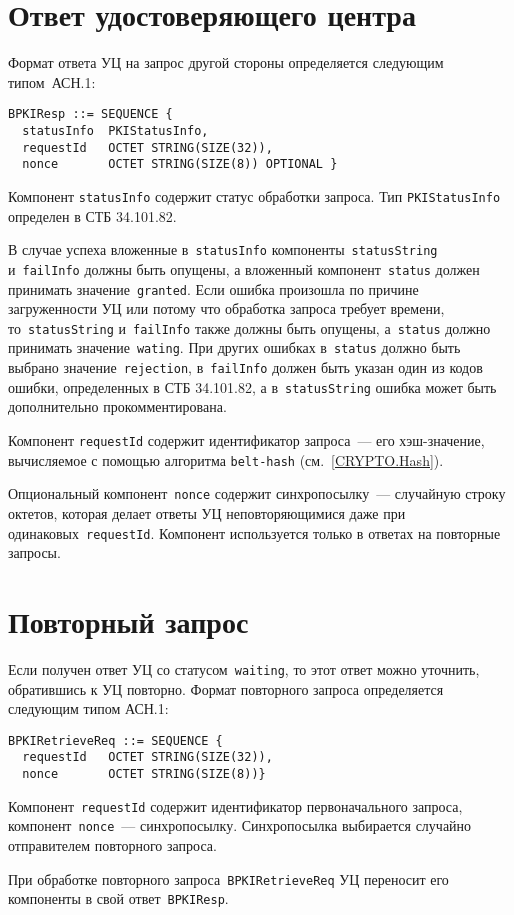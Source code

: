 \section{Ответ удостоверяющего центра}\label{FMT.BPKIResp}

Формат ответа УЦ на запрос другой стороны определяется следующим типом~АСН.1:
\begin{verbatim}
BPKIResp ::= SEQUENCE { 
  statusInfo  PKIStatusInfo,
  requestId   OCTET STRING(SIZE(32)),
  nonce       OCTET STRING(SIZE(8)) OPTIONAL }
\end{verbatim}

Компонент \texttt{statusInfo} содержит статус обработки запроса.
Тип \texttt{PKIStatusInfo} определен в СТБ 34.101.82. 

В случае успеха вложенные в~\texttt{statusInfo} 
компоненты~\texttt{statusString} 
и~\texttt{failInfo} должны быть опущены, а вложенный
компонент~\texttt{status} должен принимать значение~\texttt{granted}.
%
Если ошибка произошла по причине загруженности УЦ или потому
что обработка запроса требует времени, 
то~\texttt{statusString} и~\texttt{failInfo} также должны быть опущены, 
а~\texttt{status} должно принимать значение~\texttt{wating}.
%
При других ошибках в~\texttt{status} должно быть выбрано 
значение~\texttt{rejection}, в~\texttt{failInfo} должен быть указан один 
из кодов ошибки, определенных в СТБ 34.101.82, а в~\texttt{statusString} 
ошибка может быть дополнительно прокомментирована.

Компонент \texttt{requestId} содержит идентификатор запроса~--- 
его хэш-значение, вычисляемое с помощью алгоритма \texttt{belt-hash} 
(см.~\ref{CRYPTO.Hash}). 

Опциональный компонент~\texttt{nonce} содержит синхропосылку~---
случайную строку октетов, которая делает ответы УЦ неповторяющимися даже 
при одинаковых~\texttt{requestId}. Компонент используется только в ответах
на повторные запросы.

\section{Повторный запрос}\label{FMT.BPKIRetrieveReq}

Если получен ответ УЦ со статусом~\texttt{waiting}, то этот ответ можно 
уточнить, обратившись к УЦ повторно. Формат повторного запроса 
определяется следующим типом АСН.1:
\begin{verbatim}
BPKIRetrieveReq ::= SEQUENCE { 
  requestId   OCTET STRING(SIZE(32)),
  nonce       OCTET STRING(SIZE(8))}
\end{verbatim}

Компонент~\texttt{requestId} содержит идентификатор первоначального 
запроса, компонент~\texttt{nonce}~--- синхропосылку. Синхропосылка 
выбирается случайно отправителем повторного запроса. 

При обработке повторного запроса~\texttt{BPKIRetrieveReq} УЦ
переносит его компоненты в свой ответ~\texttt{BPKIResp}.

